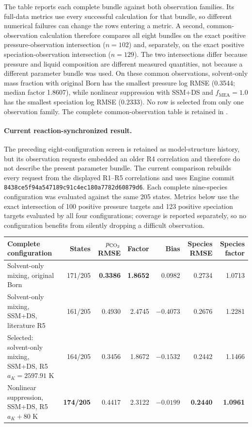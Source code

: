 \documentclass[10pt,oneside]{scrartcl}
\begin{document}
The table reports each complete bundle against both observation families.
Its full-data metrics use every successful calculation for that bundle, so
different numerical failures can change the rows entering a metric. A second,
common-observation calculation therefore compares all eight bundles on the
exact positive pressure-observation intersection ($n=102$) and, separately,
on the exact positive speciation-observation intersection ($n=129$). The two
intersections differ because pressure and liquid composition are different
measured quantities, not because a different parameter bundle was used.
On these common observations, solvent-only mass fraction with original Born
has the smallest pressure log RMSE (0.3544; median factor 1.8607), while
nonlinear suppression with SSM+DS and $f_{\mathrm{MEA}}=1.0$ has the smallest
speciation log RMSE (0.2333). No row is selected from only one observation
family. The complete common-observation table is retained in
.

\paragraph{Current reaction-synchronized result.}
The preceding eight-configuration screen is retained as model-structure
history, but its observation requests embedded an older R4 correlation and
therefore do not describe the present parameter bundle. The current comparison
rebuilds every request from the displayed R1--R5 correlations and uses Engine
commit \nolinkurl{8438ce5f94a547189c91c4ec180a7782d60879d6}. Each complete
nine-species configuration was evaluated against the same 205 states. Metrics
below use the exact intersection of 100 positive pressure targets and 123
positive speciation targets evaluated by all four configurations; coverage is
reported separately, so no configuration benefits from silently dropping a
difficult observation.

\begin{center}
\small
\begin{tabularx}{\textwidth}{@{}Yrrrrrr@{}}
\toprule
Complete configuration & States & $p_{\ce{CO2}}$ RMSE & Factor & Bias & Species RMSE & Species factor \\
\midrule
Solvent-only mixing, original Born & 171/205 & \textbf{0.3386} & \textbf{1.8652} & 0.0982 & 0.2734 & 1.0713 \\
Solvent-only mixing, SSM+DS, literature R5 & 161/205 & 0.4930 & 2.4745 & $-0.4073$ & 0.2676 & 1.2281 \\
Selected: solvent-only mixing, SSM+DS, R5 $a_K=2597.91$ K & 164/205 & 0.3456 & 1.8672 & $-0.1532$ & 0.2442 & 1.1466 \\
Nonlinear suppression, SSM+DS, R5 $a_K+80$ K & \textbf{174/205} & 0.4417 & 2.3122 & \textbf{$-0.0199$} & \textbf{0.2440} & \textbf{1.0961} \\
\bottomrule
\end{tabularx}
\end{center}
\end{document}
